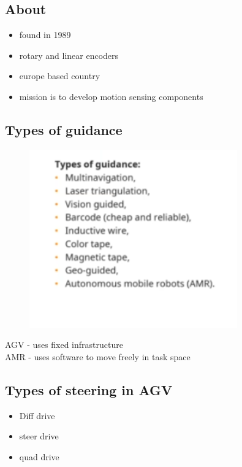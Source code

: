 \documentclass[a4paper]{article}
\begin{document}
\subsection{About}
\begin{itemize}
	\item found in 1989
	\item rotary and linear encoders
	\item europe based country
	\item mission is to develop motion sensing components
\end{itemize}
\subsection{Types of guidance}
\begin{figure}[H]
	\centering
	\includegraphics[width=0.8\textwidth]{guidance.png}
	\caption{}
	\label{fig:}
\end{figure}
AGV - uses fixed infrastructure \\
AMR - uses software to move freely in task space
\subsection{Types of steering in AGV}
\begin{itemize}
	\item Diff drive
	\item steer drive
	\item quad drive
\end{itemize}
\end{document}
